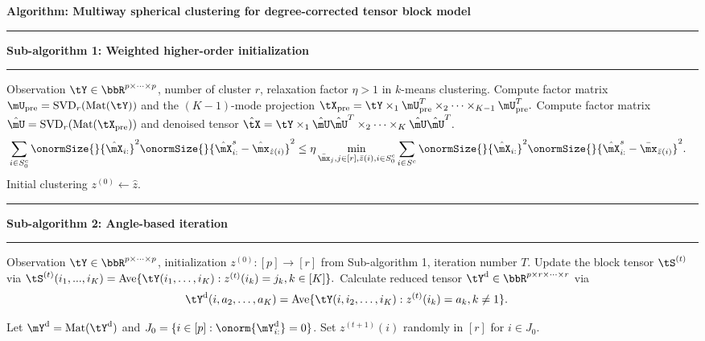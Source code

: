\documentclass[lettersize,onecolumn,journal]{IEEEtran}
\theoremstyle{definition}
\theoremstyle{definition}
\newcommand\Algphase[1]{%
\vspace*{-.7\baselineskip}\Statex\hspace*{\dimexpr-\algorithmicindent-2pt\relax}\rule{\columnwidth}{0.4pt}%
\Statex\hspace*{-\algorithmicindent}\textbf{#1}%
\vspace*{-.7\baselineskip}\Statex\hspace*{\dimexpr-\algorithmicindent-2pt\relax}\rule{\columnwidth}{0.4pt}%
}
\begin{document}
\begin{algorithm}[h!]
\caption*{\bf Algorithm: Multiway spherical clustering for degree-corrected tensor block model }
\vspace{.15cm}
\begin{algorithmic}[1]
\Algphase{Sub-algorithm 1: Weighted higher-order initialization}
\INPUT Observation $\tY \in \bbR^{p\times \cdots \times p}$, number of cluster $r$, relaxation factor $\eta > 1$ in $k$-means clustering.
\State Compute factor matrix $ \mU_{\text{pre}} = \text{SVD}_{r} (\text{Mat}(\tY))$ and the $(K-1)$-mode projection $
\tX_{\text{pre}} = \tY \times_1  \mU_{\text{pre}}^T \times_2 \cdots \times_{K-1} \mU_{\text{pre}}^T.$
\State Compute factor matrix $\hat \mU = \text{SVD}_{r}(\text{Mat}(\tX_{\text{pre}}))$ and denoised tensor
$\hat \tX = \tY \times_1 \hat \mU \hat \mU^T \times_2 \cdots \times_K \hat \mU \hat \mU^T.$
\begin{align}
    &\sum_{i \in S_0^c }  \onormSize{}{\hat \mX_{i:}}^2 \onormSize{}{\hat \mX_{i:}^s - \hat \mx_{\hat z(i)} }^2 
    \leq 
    \eta \min_{\substack{\bar \mx_j, j\in[r], \bar z(i),i\in S_0^{c}}} \sum_{i \in S^c } \onormSize{}{\hat \mX_{i:}}^2 \onormSize{}{ \hat \mX_{i:}^s -   \bar \mx_{\bar z(i)}}^2.
\end{align}
\OUTPUT Initial clustering $z^{(0)} \leftarrow \hat z$.

\Algphase{Sub-algorithm 2: Angle-based iteration}
\INPUT Observation $\tY \in \bbR^{p \times \cdots \times p}$, initialization $z^{(0)} \colon [p]\to[r]$ from Sub-algorithm 1, iteration number $T$.
\State Update the block tensor $\tS^{(t)}$ via
$\tS^{(t)} (i_1,...,i_K)= \text{Ave} \{\tY(i_1,\ldots,i_K): z^{(t)}(i_k) = j_k, k \in [K]\}.$
\State Calculate reduced tensor $\tY^{\text{d}} \in \bbR^{p \times r \times \cdots \times r}$ via
\begin{align}
    &\tY^{\text{d}}(i,a_2,\ldots,a_K) 
    = 
\text{Ave}\{\tY(i,i_2,\ldots,i_K): z^{(t)}(i_k) = a_k, k \neq 1 \}.
\end{align}

\State Let $\mY^{\text{d}} = \text{Mat}(\tY^{\text{d}})$ and $J_0 = \{ i\in[p]: \onorm{\mY^{\text{d}}_{i:}} = 0\}$. Set $z^{(t+1)}(i)$ randomly in $[r]$ for $i \in J_0$.


\end{algorithmic}
\end{algorithm}
\end{document}
